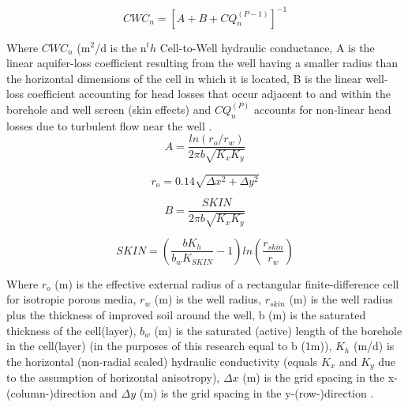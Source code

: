 \begin{equation}
 CWC_n = [A + B + CQ_{n}^{(P-1)}]^{-1}
\label{eq:CWC_n}
\end{equation}  

Where $CWC_n$ (m$^2$/d is the n$^th$ Cell-to-Well hydraulic conductance, A is the linear aquifer-loss coefficient resulting from the well having a smaller radius than the horizontal dimensions of the cell in which it is located, B is the linear well-loss coefficient accounting for head losses that occur adjacent to and within the borehole and well screen (skin effects) and $CQ_{n}^{(P)}$ accounts for non-linear head losses due to turbulent flow near the well \citep{LeonardF.KonikowGeorgeZ.HornbergerKeithJ.Halford2009}. \\

\begin{equation}
 A = \frac{ln(r_{o}/r_{w})}{2\pi b \sqrt{K_{x}K_{y}}}
\label{eq:A}
\end{equation}

\begin{equation}
 r_o = 0.14 \sqrt{\Delta x^2 + \Delta y^2}
\label{eq:r_o}
\end{equation}

\begin{equation}
 B = \frac{SKIN}{2\pi b \sqrt{K_{x}K_{y}}}
\label{eq:B}
\end{equation}   

\begin{equation}
 SKIN = {(\frac{bK_{h}}{b_{w}K_{SKIN}}-1)} ln(\frac{r_{skin}}{r_{w}})
\label{eq:SKIN}
\end{equation}   

Where $r_{o}$ (m) is the effective external radius of a rectangular finite-difference cell for isotropic porous media, $r_{w}$ (m) is the well radius, $r_{skin}$ (m) is the well radius plus the thickness of improved soil around the well, b (m) is the saturated thickness of the cell(layer), $b_{w}$ (m) is the saturated (active) length of the borehole in the cell(layer) (in the purposes of this research equal to b (1m)), $K_{h}$ (m/d) is the horizontal (non-radial scaled) hydraulic conductivity (equals $K_{x}$ and $K_{y}$ due to the assumption of horizontal anisotropy), $\Delta x$ (m) is the grid spacing in the x-(column-)direction and $\Delta y$ (m) is the grid spacing in the y-(row-)direction \citep{LeonardF.KonikowGeorgeZ.HornbergerKeithJ.Halford2009}. \\

